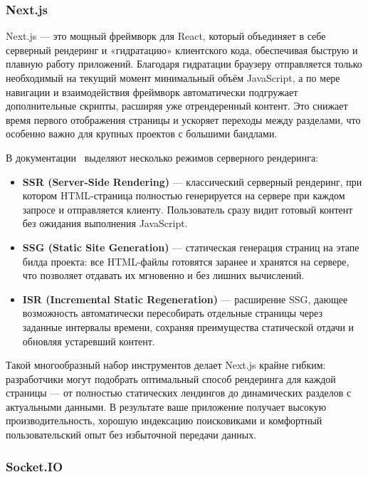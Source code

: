 \subsubsection*{Next.js}

Next.js — это мощный фреймворк для React, который объединяет в себе серверный рендеринг и «гидратацию» клиентского кода, обеспечивая быструю и плавную работу приложений. Благодаря гидратации браузеру отправляется только необходимый на текущий момент минимальный объём JavaScript, а по мере навигации и взаимодействия фреймворк автоматически подгружает дополнительные скрипты, расширяя уже отрендеренный контент. Это снижает время первого отображения страницы и ускоряет переходы между разделами, что особенно важно для крупных проектов с большими бандлами.

В документации~\cite{nextjs_ssr} выделяют несколько режимов серверного рендеринга:
\begin{itemize}
  \item \textbf{SSR (Server-Side Rendering)} — классический серверный рендеринг, при котором HTML-страница полностью генерируется на сервере при каждом запросе и отправляется клиенту. Пользователь сразу видит готовый контент без ожидания выполнения JavaScript.
  \item \textbf{SSG (Static Site Generation)} — статическая генерация страниц на этапе билда проекта: все HTML-файлы готовятся заранее и хранятся на сервере, что позволяет отдавать их мгновенно и без лишних вычислений\cite{nextjs_ssg_isr}.
  \item \textbf{ISR (Incremental Static Regeneration)} — расширение SSG, дающее возможность автоматически пересобирать отдельные страницы через заданные интервалы времени, сохраняя преимущества статической отдачи и обновляя устаревший контент\cite{nextjs_ssg_isr}.
\end{itemize}

Такой многообразный набор инструментов делает Next.js крайне гибким: разработчики могут подобрать оптимальный способ рендеринга для каждой страницы --- от полностью статических лендингов до динамических разделов с актуальными данными. В результате ваше приложение получает высокую производительность, хорошую индексацию поисковиками и комфортный пользовательский опыт без избыточной передачи данных.

\subsubsection*{Socket.IO}

